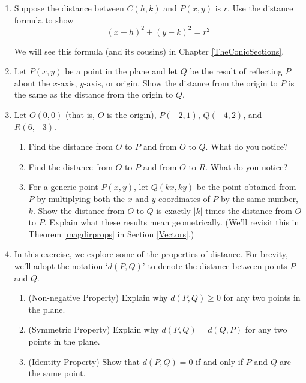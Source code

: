 \begin{enumerate}
\item  Suppose the distance between  $C(h,k)$ and $P(x,y)$ is $r$.  Use the distance formula to show \[(x-h)^2 + (y-k)^2 = r^2\]

We will see this formula (and its cousins) in Chapter \ref{TheConicSections}.


\item  Let $P(x,y)$ be a point in the plane and let $Q$ be the result of reflecting $P$ about the $x$-axis, $y$-axis, or origin.  Show the distance from the origin to $P$ is the same as the distance from the origin to $Q$.  


\item \label{scalingdistance} Let $O(0,0)$ (that is, $O$ is the origin),  $P(-2,1)$, $Q(-4,2)$, and $R(6,-3)$.  

\begin{enumerate}

\item  Find the distance from $O$ to $P$ and from $O$ to $Q$.  What do you notice?

\item  Find the distance from $O$ to $P$ and from $O$ to $R$.  What do you notice?

\item  For a generic point $P(x,y)$, let $Q(kx, ky)$ be the point obtained from $P$ by multiplying both the $x$ and $y$ coordinates of $P$ by the same number, $k$.  Show the distance from $O$ to $Q$ is exactly $|k|$ times the distance from $O$ to $P$.  Explain what these results mean geometrically. (We'll revisit this in Theorem \ref{magdirprops} in Section \ref{Vectors}.)

\end{enumerate}


\item \label{distancemetricprops} In this exercise, we explore some of the properties of distance.  For brevity, we'll adopt the notation `$d(P,Q)$' to denote the distance between points $P$ and $Q$.
\begin{enumerate}  

\item  (Non-negative Property) Explain why $d(P,Q) \geq 0$ for any two points in the plane.

\item  (Symmetric Property) Explain why $d(P,Q) = d(Q,P)$ for any two points in the plane.

\item  (Identity Property) Show that $d(P,Q) = 0$ \underline{if and only if} $P$ and $Q$ are the same point.


\end{enumerate}
\end{enumerate}

